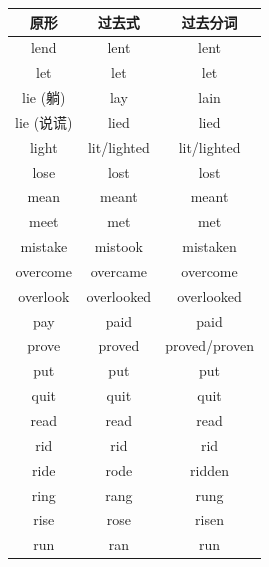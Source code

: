 \begin{center}
\begin{tabular}{c|c|c}
\textbf{原形} & \textbf{过去式} & \textbf{过去分词} \\ \toprule
lend & lent & lent \\
let & let & let \\
lie (躺) & lay & lain \\
lie (说谎) & lied & lied \\
light & lit/lighted & lit/lighted \\
lose & lost & lost \\
mean & meant & meant \\
meet & met & met \\
mistake & mistook & mistaken \\
overcome & overcame & overcome \\
overlook & overlooked & overlooked \\
pay & paid & paid \\
prove & proved & proved/proven \\
put & put & put \\
quit & quit & quit \\
read & read & read \\
rid & rid & rid \\
ride & rode & ridden \\
ring & rang & rung \\
rise & rose & risen \\
run & ran & run \\
\bottomrule
\end{tabular}
\end{center}

